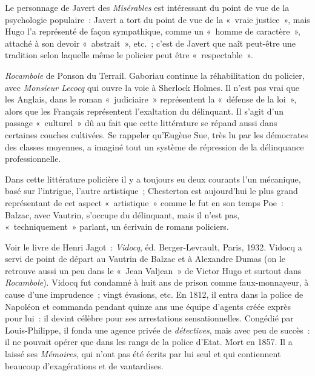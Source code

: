 \documentclass[french,twoside]{book} %
\begin{document}
Le personnage de Javert des \emph{Misérables} est intéressant du point de vue de la psychologie populaire : Javert a tort du point de vue de la « vraie justice », mais Hugo l’a représenté de façon sympathique, comme un « homme de caractère », attaché à son devoir « abstrait », etc. ; c’est de Javert que naît peut-être une tradition selon laquelle même le policier peut être « respectable ».\par
\emph{Rocambole} de Ponson du Terrail. Gaboriau continue la réhabilitation du policier, avec \emph{Monsieur Lecocq} qui ouvre la voie à Sherlock Holmes. Il n’est pas vrai que les Anglais, dans le roman « judiciaire » représentent la « défense de la loi », alors que les Français représentent l’exaltation du délinquant. Il s’agit d’un passage « culturel » dû au fait que cette littérature se répand aussi dans certaines couches cultivées. Se rappeler qu’Eugène Sue, très lu par les démocrates des classes moyennes, a imaginé tout un système de répression de la délinquance professionnelle.\par
Dans cette littérature policière il y a toujours eu deux courants l’un mécanique, basé sur l’intrigue, l’autre artistique ; Chesterton est aujourd’hui le plus grand représentant de cet aspect « artistique » comme le fut en son temps Poe : Balzac, avec Vautrin, s’occupe du délinquant, mais il n’est pas, « techniquement » parlant, un écrivain de romans policiers.\par
{\raggedleft \noindent [1934-1935]\par}
\noindent Voir le livre de Henri Jagot : \emph{Vidocq}, éd. Berger-Levrault, Paris, 1932. Vidocq a servi de point de départ au Vautrin de Balzac et à Alexandre Dumas (on le retrouve aussi un peu dans le « Jean Valjean » de Victor Hugo et surtout dans \emph{Rocambole}). Vidocq fut condamné à huit ans de prison comme faux-monnayeur, à cause d’une imprudence ; vingt évasions, etc. En 1812, il entra dans la police de Napoléon et commanda pendant quinze ans une équipe d’agents créée exprès pour lui : il devint célèbre pour ses arrestations sensationnelles. Congédié par Louis-Philippe, il fonda une agence privée de \emph{détectives}, mais avec peu de succès : il ne pouvait opérer que dans les rangs de la police d’Etat. Mort en 1857. Il a laissé ses \emph{Mémoires}, qui n’ont pas été écrits par lui seul et qui contiennent beaucoup d’exagérations et de vantardises.\par
\end{document}
